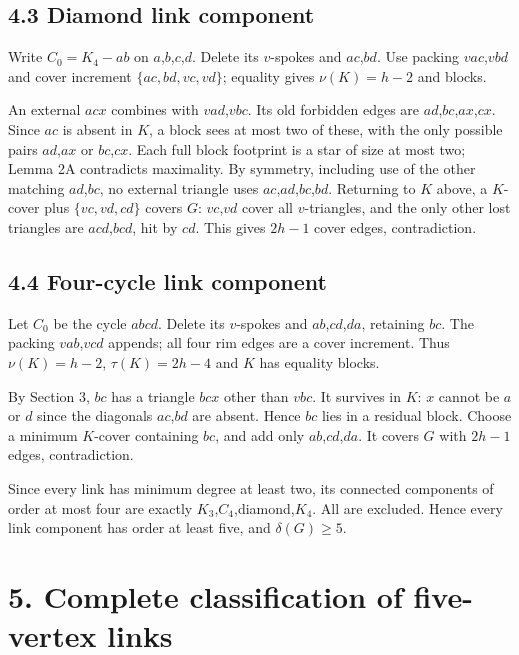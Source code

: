 \documentclass[11pt]{article}
\begin{document}
\subsection{4.3 Diamond link component}\label{diamond-link-component}

Write \(C_0=K_4-ab\) on \(a\),\(b\),\(c\),\(d\). Delete its \(v\)-spokes
and \(ac\),\(bd\). Use packing \(vac\),\(vbd\) and cover increment
\(\{ac,bd,vc,vd\}\); equality gives \(\nu(K)=h-2\) and blocks.

An external \(acx\) combines with \(vad\),\(vbc\). Its old forbidden
edges are \(ad\),\(bc\),\(ax\),\(cx\). Since \(ac\) is absent in \(K\),
a block sees at most two of these, with the only possible pairs
\(ad\),\(ax\) or \(bc\),\(cx\). Each full block footprint is a star of
size at most two; Lemma 2A contradicts maximality. By symmetry,
including use of the other matching \(ad\),\(bc\), no external triangle
uses \(ac\),\(ad\),\(bc\),\(bd\). Returning to \(K\) above, a
\(K\)-cover plus \(\{vc,vd,cd\}\) covers \(G\): \(vc\),\(vd\) cover all
\(v\)-triangles, and the only other lost triangles are \(acd\),\(bcd\),
hit by \(cd\). This gives \(2h-1\) cover edges, contradiction.

\subsection{4.4 Four-cycle link
component}\label{four-cycle-link-component}

Let \(C_0\) be the cycle \(abcd\). Delete its \(v\)-spokes and
\(ab\),\(cd\),\(da\), retaining \(bc\). The packing \(vab\),\(vcd\)
appends; all four rim edges are a cover increment. Thus \(\nu(K)=h-2\),
\(\tau(K)=2h-4\) and \(K\) has equality blocks.

By Section 3, \(bc\) has a triangle \(bcx\) other than \(vbc\). It
survives in \(K\): \(x\) cannot be \(a\) or \(d\) since the diagonals
\(ac\),\(bd\) are absent. Hence \(bc\) lies in a residual block. Choose
a minimum \(K\)-cover containing \(bc\), and add only
\(ab\),\(cd\),\(da\). It covers \(G\) with \(2h-1\) edges,
contradiction.

Since every link has minimum degree at least two, its connected
components of order at most four are exactly
\(K_3\),\(C_4\),diamond,\(K_4\). All are excluded. Hence every link
component has order at least five, and \(\delta(G)\ge 5\).

\section{5. Complete classification of five-vertex
links}\label{complete-classification-of-five-vertex-links}
\end{document}
